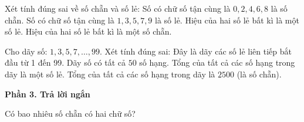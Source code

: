 \begin{ex} %
Xét tính đúng sai về số chẵn và số lẻ:
\choiceTF
{\True Số có chữ số tận cùng là $0, 2, 4, 6, 8$ là số chẵn.}
{\True Số có chữ số tận cùng là $1, 3, 5, 7, 9$ là số lẻ.}
{Hiệu của hai số lẻ bất kì là một số lẻ.}
{\True Hiệu của hai số lẻ bất kì là một số chẵn.}
\end{ex}

\begin{ex} %
Cho dãy số: $1, 3, 5, 7, \dots, 99$. Xét tính đúng sai:
\choiceTF
{\True Đây là dãy các số lẻ liên tiếp bắt đầu từ 1 đến 99.}
{\True Dãy số có tất cả $50$ số hạng.}
{Tổng của tất cả các số hạng trong dãy là một số lẻ.}
{\True Tổng của tất cả các số hạng trong dãy là $2500$ (là số chẵn).}
\end{ex}

\textbf{Phần 3. Trả lời ngắn}

\begin{ex} %
Có bao nhiêu số chẵn có hai chữ số?
\end{ex}

